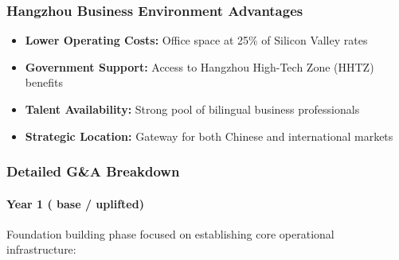 \subsubsection{Hangzhou Business Environment Advantages}
\begin{itemize}
    \item \textbf{Lower Operating Costs:} Office space at 25\% of Silicon Valley rates
    \item \textbf{Government Support:} Access to Hangzhou High-Tech Zone (HHTZ) benefits
    \item \textbf{Talent Availability:} Strong pool of bilingual business professionals
    \item \textbf{Strategic Location:} Gateway for both Chinese and international markets
\end{itemize}

\subsubsection{Detailed G\&A Breakdown}

\paragraph{Year 1 ( base /  uplifted)}
Foundation building phase focused on establishing core operational infrastructure:

